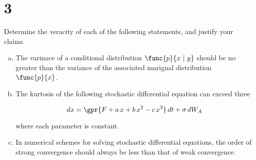 \section{3}

Determine the veracity of each of the following statements, and justify your claims.

\begin{enumerate}[a)]
	\item The varinace of a conditional distribution $\func{p}{x\ \vert\ y}$ should be no greater than the variance of the associated marignal distribution $\func{p}{x}$.
	
	\item The kurtosis of the following stochastic differential equation can exceed three
	
		\begin{equation}
			dx = \gpr{F + a\,x + b\,x^2 - c\,x^3}\,dt + \sigma\,d{W_{A}}
		\end{equation}
		
		where each parameter is constant.
		
	\item In numerical schemes for solving stochastic differential equations, the order of strong convergence should always be less than that of weak convergence.	
\end{enumerate}

